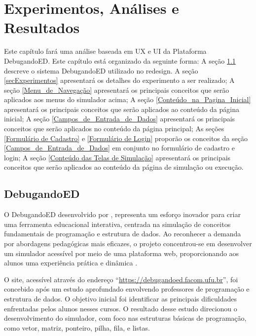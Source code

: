 \chapter[Experimentos, Análises e Resultados]{Experimentos, Análises e Resultados}
\label{capExperimentos}

Este capítulo fará uma análise baseada em \acs{UX} e \acs{UI} da Plataforma DebugandoED. Este capítulo está organizado da seguinte forma: A seção \ref{secDebugandoED} descreve o sistema DebugandoED utilizado no redesign. A seção \ref{secExperimentos} apresentará os detalhes do experimento a ser realizado; A seção \ref{Menu_de_Navegação} apresentará os principais conceitos que serão aplicados aos menus do simulador acima; A seção \ref{Conteúdo_na_Pagina_Inicial} apresentará os principais conceitos que serão aplicados ao conteúdo da página inicial; A seção \ref{Campos_de_Entrada_de_Dados} apresentará os principais conceitos que serão aplicados no conteúdo da página principal; As seções \ref{Formulário de Cadastro} e \ref{Formulário de Login} proporão os conceitos da seção \ref{Campos_de_Entrada_de_Dados} em conjunto no formulário de cadastro e login; A seção \ref{Conteúdo das Telas de Simulação} apresentará os principais conceitos que serão aplicados ao conteúdo da página de simulação ou execução.

\section{DebugandoED}
\label{secDebugandoED}
O DebugandoED desenvolvido por , representa um esforço inovador para criar uma ferramenta educacional interativa, centrada na simulação de conceitos fundamentais de programação e estrutura de dados. Ao reconhecer a demanda por abordagens pedagógicas mais eficazes, o projeto concentrou-se em desenvolver um simulador acessível por meio de uma plataforma web, proporcionando aos alunos uma experiência prática e dinâmica \cite{borges2021ensino}.

O site, acessível através do endereço “\href{https://debugandoed.facom.ufu.br}{https://debugandoed.facom.ufu.br}”, foi concebido após um estudo aprofundado envolvendo professores de programação e estrutura de dados. O objetivo inicial foi identificar as principais dificuldades enfrentadas pelos alunos nesses cursos. O resultado desse estudo direcionou o desenvolvimento do simulador, com foco nas estruturas básicas de programação, como vetor, matriz, ponteiro, pilha, fila, e listas.

